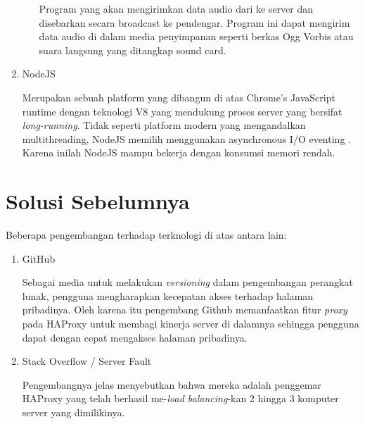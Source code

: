 \begin{enumerate}
\begin{enumerate}
        Program yang akan mengirimkan data audio dari ke server dan disebarkan secara broadcast ke pendengar. Program ini dapat mengirim data audio di dalam media penyimpanan seperti berkas Ogg Vorbis atau suara langsung yang ditangkap sound card.
    \end{enumerate}
    
    \item NodeJS
    
    Merupakan sebuah platform yang dibangun di atas Chrome's JavaScript runtime dengan teknologi V8 yang mendukung proses server yang bersifat \textit{long-running}. Tidak seperti platform modern yang mengandalkan multithreading, NodeJS memilih menggunakan asynchronous I/O eventing \cite{nodejsieee}. Karena inilah NodeJS mampu bekerja dengan konsumsi memori rendah.
    
    
    
\end{enumerate}

\section{Solusi Sebelumnya}

Beberapa pengembangan terhadap terknologi di atas antara lain:

\begin{enumerate}
    \item GitHub
    
    Sebagai media untuk melakukan \textit{versioning} dalam pengembangan perangkat lunak, pengguna mengharapkan kecepatan akses terhadap halaman pribadinya. Oleh karena itu pengembang Github memanfaatkan fitur \textit{proxy} pada HAProxy untuk membagi kinerja server di dalamnya sehingga pengguna dapat dengan cepat mengakses halaman pribadinya. \cite{hause}
    
    \item Stack Overflow / Server Fault
    
    Pengembangnya jelas menyebutkan bahwa mereka adalah penggemar HAProxy yang telah berhasil me-\textit{load balancing}-kan 2 hingga 3 komputer server yang dimilikinya. \cite{hause}
\end{enumerate}
